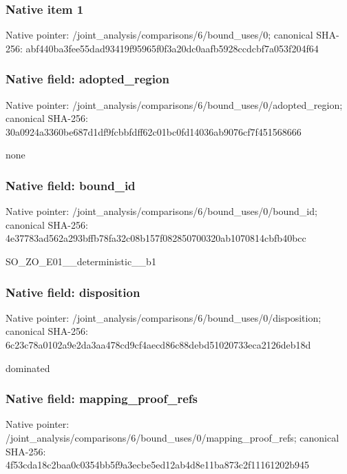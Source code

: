 \documentclass[10pt,a4paper]{article}
\begin{document}
\subsubsection{Native item 1}
Native pointer: /joint\_\allowbreak{}analysis/comparisons/6/bound\_\allowbreak{}uses/0; canonical SHA-256: abf440ba3fee55dad93419f95965f0f3a20dc0aafb5928ccdcbf7a053f204f64

\subsubsection{Native field: adopted\_\allowbreak{}region}
Native pointer: /joint\_\allowbreak{}analysis/comparisons/6/bound\_\allowbreak{}uses/0/adopted\_\allowbreak{}region; canonical SHA-256: 30a0924a3360be687d1df9fcbbfdff62c01bc0fd14036ab9076cf7f451568666

\begingroup\raggedright\sloppy none\par\endgroup

\subsubsection{Native field: bound\_\allowbreak{}id}
Native pointer: /joint\_\allowbreak{}analysis/comparisons/6/bound\_\allowbreak{}uses/0/bound\_\allowbreak{}id; canonical SHA-256: 4e37783ad562a293bffb78fa32c08b157f082850700320ab1070814cbfb40bcc

\begingroup\raggedright\sloppy SO\_\allowbreak{}ZO\_\allowbreak{}E01\_\allowbreak{}\_\allowbreak{}deterministic\_\allowbreak{}\_\allowbreak{}b1\par\endgroup

\subsubsection{Native field: disposition}
Native pointer: /joint\_\allowbreak{}analysis/comparisons/6/bound\_\allowbreak{}uses/0/disposition; canonical SHA-256: 6c23c78a0102a9e2da3aa478cd9cf4aecd86c88debd51020733eca2126deb18d

\begingroup\raggedright\sloppy dominated\par\endgroup

\subsubsection{Native field: mapping\_\allowbreak{}proof\_\allowbreak{}refs}
Native pointer: /joint\_\allowbreak{}analysis/comparisons/6/bound\_\allowbreak{}uses/0/mapping\_\allowbreak{}proof\_\allowbreak{}refs; canonical SHA-256: 4f53cda18c2baa0c0354bb5f9a3ecbe5ed12ab4d8e11ba873c2f11161202b945
\end{document}

